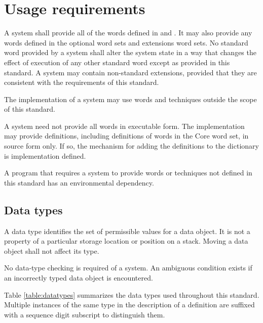 
\chapter{Usage requirements}
\label{usage}

A system shall provide all of the words defined in
 and .
It may also provide any
words defined in the optional word sets and extensions word
sets. No standard word provided by a system shall alter the
system state in a way that changes the effect of execution of
any other standard word except as provided in this standard.
A system may contain non-standard extensions, provided that
they are consistent with the requirements of this standard.

The implementation of a system may use words and techniques
outside the scope of this standard.

A system need not provide all words in executable form. The
implementation may provide definitions, including definitions
of words in the Core word set, in source form only. If so,
the mechanism for adding the definitions to the dictionary
is implementation defined.

A program that requires a system to provide words or techniques
not defined in this standard has an environmental dependency.

\section{Data types} %
\label{usage:data}

A data type identifies the set of permissible values for a
data object. It is not a property of a particular storage
location or position on a stack. Moving a data object shall
not affect its type.

No data-type checking is required of a system. An ambiguous
condition exists if an incorrectly typed data object is
encountered.

Table \ref{table:datatypes} summarizes the data types used
throughout this standard. Multiple instances of the same
type in the description of a definition are suffixed with
a sequence digit subscript to distinguish them.

